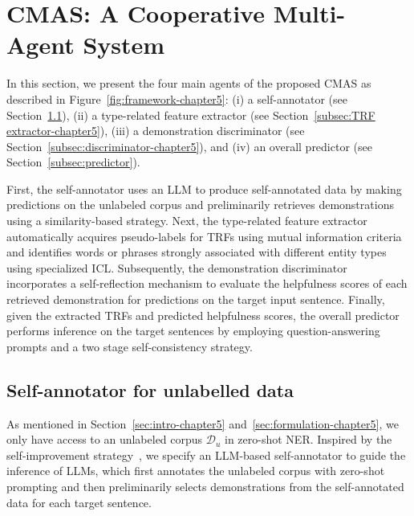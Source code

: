 \section{CMAS: A Cooperative Multi-Agent System}
In this section, we present the four main agents of the proposed \ac{CMAS} as described in Figure~\ref{fig:framework-chapter5}: (i) a self-annotator (see Section~\ref{subsec:self-annotator-chapter5}), (ii) a type-related feature extractor (see Section~\ref{subsec:TRF extractor-chapter5}), (iii) a demonstration discriminator (see Section~\ref{subsec:discriminator-chapter5}), and (iv) an overall predictor (see Section~\ref{subsec:predictor}).

First, the self-annotator uses an \ac{LLM} to produce self-annotated data by making predictions on the unlabeled corpus and preliminarily retrieves demonstrations using a similarity-based strategy. Next, the type-related feature extractor automatically acquires pseudo-labels for \acp{TRF} using mutual information criteria and identifies words or phrases strongly associated with different entity types using specialized \ac{ICL}. Subsequently, the demonstration discriminator incorporates a self-reflection mechanism to evaluate the helpfulness scores of each retrieved demonstration for predictions on the target input sentence. Finally, given the extracted \acp{TRF} and predicted helpfulness scores, the overall predictor performs inference on the target sentences by employing question-answering prompts and a two stage self-consistency strategy. 

\subsection{Self-annotator for unlabelled data}
\label{subsec:self-annotator-chapter5}
As mentioned in Section~\ref{sec:intro-chapter5} and~\ref{sec:formulation-chapter5}, we only have access to an unlabeled corpus $\mathcal{D}_{u}$ in zero-shot \ac{NER}. Inspired by the self-improvement strategy~\citep{DBLP:journals/corr/abs-2311-08921}, we specify an \ac{LLM}-based self-annotator to guide the inference of \acp{LLM}, which first annotates the unlabeled corpus with zero-shot prompting and then preliminarily selects demonstrations from the self-annotated data for each target sentence.

